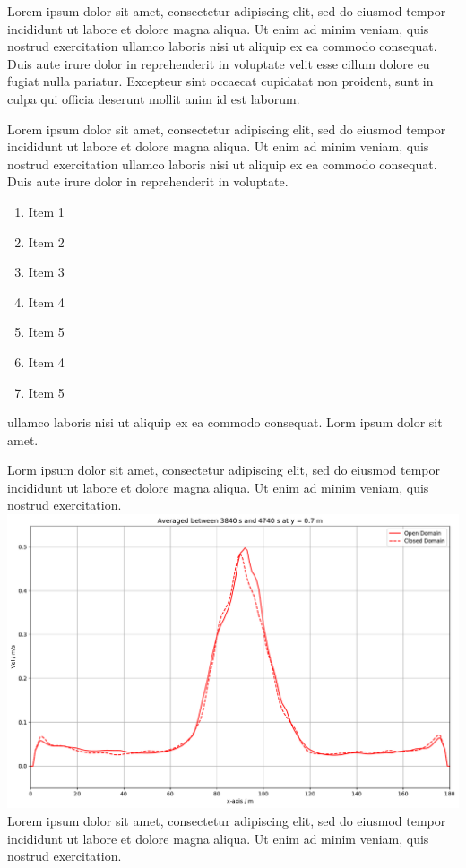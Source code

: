 \documentclass[12pt]{article}
\begin{document}
Lorem ipsum dolor sit amet, consectetur adipiscing elit, sed do eiusmod tempor incididunt ut labore et dolore magna aliqua.
Ut enim ad minim veniam, quis nostrud exercitation ullamco laboris nisi ut aliquip ex ea commodo consequat. Duis aute irure dolor in
reprehenderit in voluptate velit esse cillum dolore eu fugiat nulla pariatur. Excepteur sint occaecat cupidatat non proident, sunt in culpa qui
officia deserunt mollit anim id est laborum.
%
\vspace{0.4cm}
%
\begin{multicols*}{2}
Lorem ipsum dolor sit amet, consectetur adipiscing elit, sed do eiusmod tempor incididunt ut labore et dolore magna aliqua. Ut enim ad minim veniam, quis nostrud exercitation ullamco laboris nisi ut aliquip ex ea commodo consequat. Duis aute irure dolor in reprehenderit in voluptate.
\begin{enumerate}
\itemsep0em
\item Item 1
\item Item 2
\item Item 3
\item Item 4
\item Item 5
\item Item 4
\item Item 5
\end{enumerate}
ullamco laboris nisi ut aliquip ex ea commodo consequat. Lorm ipsum dolor sit amet.

\columnbreak

Lorm ipsum dolor sit amet, consectetur adipiscing elit, sed do eiusmod tempor incididunt ut labore et dolore magna aliqua. Ut enim ad minim veniam, quis nostrud exercitation.
\includegraphics[width=\columnwidth]{img/example.pdf}
Lorem ipsum dolor sit amet, consectetur adipiscing elit, sed do eiusmod tempor incididunt ut labore et dolore magna aliqua. Ut enim ad minim veniam, quis nostrud exercitation.

\end{multicols*}
\end{document}
